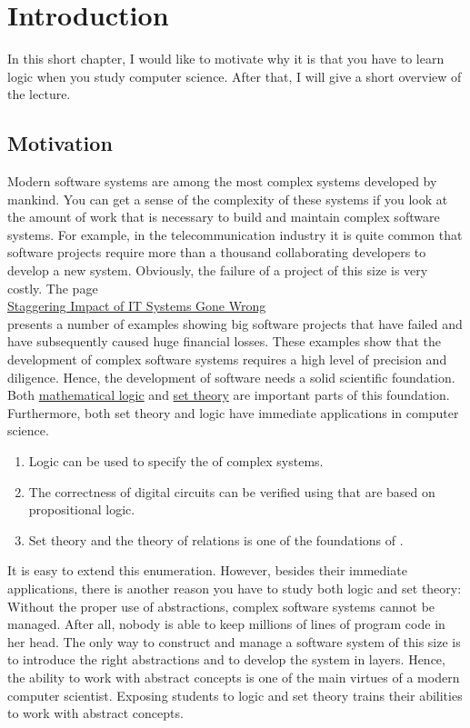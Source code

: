 \chapter{Introduction}
In this short chapter, I would like to motivate why it is that you have to learn logic when you study computer
science.  After that, I will give a short overview of the lecture.

\section{Motivation}
Modern software systems are among the most complex systems developed by mankind.  You can get a
sense of the complexity of these systems if you look at the amount of work that is necessary to
build and maintain complex software systems.  For example, in the telecommunication industry it is 
quite common that software projects require more than a thousand collaborating developers to 
develop a new system.  Obviously, the failure of a project of this size is very costly.
The page
\\[0.2cm]
\hspace*{1.3cm}
\href{http://spectrum.ieee.org/static/the-staggering-impact-of-it-systems-gone-wrong}{Staggering Impact of IT Systems Gone Wrong} 
\\[0.2cm]
presents a number of examples showing big software projects that have failed and have subsequently caused huge
financial losses.  These examples show that the development of complex software systems requires a high level
of precision and diligence.  Hence, the development of software needs a solid scientific
foundation.  Both \href{https://en.wikipedia.org/wiki/Mathematical_logic}{mathematical logic} and 
\href{https://en.wikipedia.org/wiki/Set_theory}{set theory}
are important parts of this foundation.  Furthermore, both set theory and logic have immediate applications in
computer science. 
\begin{enumerate}
\item Logic can be used to specify the  of complex systems.  
\item The correctness of digital circuits can be verified using  that are based on
      propositional logic.
\item Set theory and the theory of relations is one of the foundations of .
\end{enumerate}
It is easy to extend this enumeration.  However, besides their immediate applications, 
there is another reason you have to study both logic and set theory: Without the proper use of
{\color{blue}abstractions}, complex software systems cannot be managed.  After all, nobody is able to keep
millions of lines of program code in her head.  The only way to construct and manage a software system of this
size is to introduce the right abstractions and to develop the system in layers.  Hence, the ability
to work with abstract concepts is one of the main virtues of a modern computer scientist.  
Exposing students to logic and set theory trains their abilities to work with abstract concepts.

